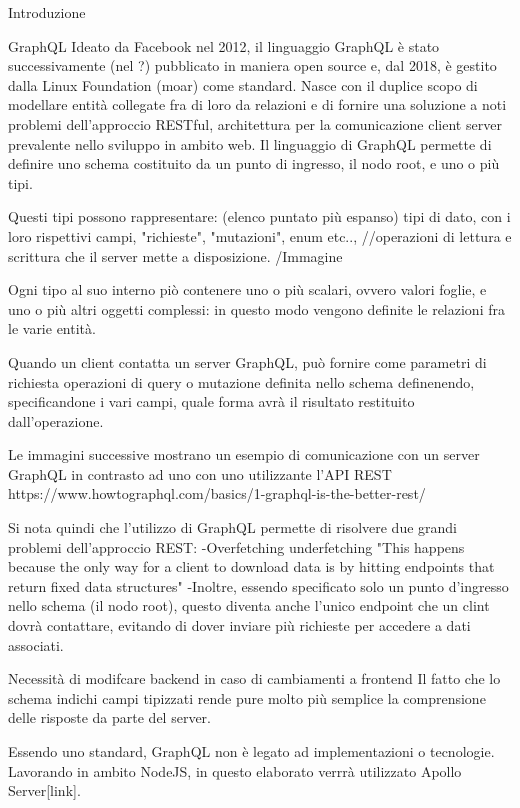 Introduzione

    GraphQL
        Ideato da Facebook nel 2012, il linguaggio GraphQL è stato successivamente (nel ?) pubblicato in maniera open source e, dal 2018, è gestito dalla Linux Foundation (moar) come standard.
        Nasce con il duplice scopo di modellare entità collegate fra di loro da relazioni e di fornire una soluzione a noti problemi dell'approccio RESTful, architettura per la comunicazione client server prevalente nello sviluppo in ambito web.
        Il linguaggio di GraphQL permette di definire uno schema costituito da un punto di ingresso, il nodo root, e uno o più tipi.
        
        Questi tipi possono rappresentare: (elenco puntato più espanso) tipi di dato, con i loro rispettivi campi, "richieste", "mutazioni", enum etc..,  //operazioni di lettura e scrittura che il server mette a disposizione.
            /Immagine
        
        Ogni tipo al suo interno piò contenere uno o più scalari, ovvero valori foglie, e uno o più altri oggetti complessi: in questo modo vengono definite le relazioni fra le varie entità.

        Quando un client contatta un server GraphQL, può fornire come parametri di richiesta operazioni di query o mutazione definita nello schema definenendo, specificandone i vari campi, quale forma avrà il risultato restituito dall'operazione.

        Le immagini successive mostrano un esempio di comunicazione con un server GraphQL in contrasto ad uno con uno utilizzante l'API REST
        https://www.howtographql.com/basics/1-graphql-is-the-better-rest/


        Si nota quindi che l'utilizzo di GraphQL permette di risolvere due grandi problemi dell'approccio REST:
            -Overfetching underfetching "This happens because the only way for a client to download data is by hitting endpoints that return fixed data structures"
            -Inoltre, essendo specificato solo un punto d'ingresso nello schema (il nodo root), questo diventa anche l'unico endpoint che un clint dovrà contattare, evitando di dover inviare più richieste per accedere a dati associati. 
        
        Necessità di modifcare backend in caso di cambiamenti a frontend
        Il fatto che lo schema indichi campi tipizzati rende pure molto più semplice la comprensione delle risposte da parte del server.

        Essendo uno standard, GraphQL non è legato ad implementazioni o tecnologie. Lavorando in ambito NodeJS, in questo elaborato verrrà utilizzato Apollo Server[link].


